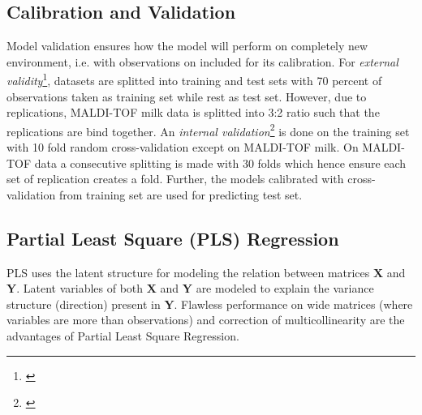 \documentclass[10pt, a4paper]{article}\usepackage[]{graphicx}\usepackage[]{color}
\begin{document}
\subsection{Calibration and Validation}
Model validation ensures how the model will perform on completely new environment, i.e. with observations on included for its calibration. For \textit{external validity}\footnote{\cite[ch.10]{martens2001multivariate}}, datasets are splitted into training and test sets with 70 percent of observations taken as training set while rest as test set. However, due to replications, MALDI-TOF milk data is splitted into 3:2 ratio such that the replications are bind together. An \textit{internal validation}\footnote{\cite[ch.10]{martens2001multivariate}} is done on the training set with 10 fold random cross-validation except on MALDI-TOF milk. On MALDI-TOF data a consecutive splitting is made with 30 folds which hence ensure each set of replication creates a fold. Further, the models calibrated with cross-validation from training set are used for predicting test set.

\subsection{Partial Least Square (PLS) Regression}
PLS uses the latent structure for modeling the relation between matrices $\mathbf{X}$ and $\mathbf{Y}$. Latent variables of both $\mathbf{X}$ and $\mathbf{Y}$ are modeled to explain the variance structure (direction) present in $\mathbf{Y}$. Flawless performance on wide matrices (where variables are more than observations) and correction of multicollinearity are the advantages of Partial Least Square Regression.
\end{document}

